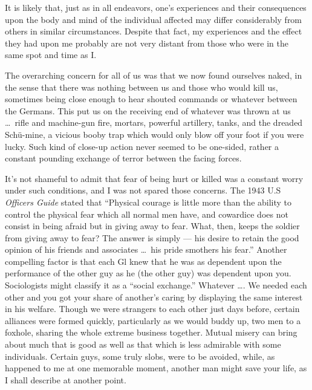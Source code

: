 \documentclass[../m3y]{subfiles}
\begin{document}
\label{beginning-of-action}
It is likely that, just as in all endeavors, one's experiences and their consequences upon the body and mind of the individual affected may differ considerably from others in similar circumstances. Despite that fact, my experiences and the effect they had upon me probably are not very distant from those who were in the same spot and time as I.

The overarching concern for all of us was that we now found ourselves naked, in the sense that there was nothing between us and those who would kill us, sometimes being close enough to hear shouted commands or whatever between the Germans. This put us on the receiving end of whatever was thrown at us \ldots\ rifle and machine-gun fire, mortars, powerful artillery, tanks, and the dreaded Sch{\"u}-mine, a vicious booby trap which would only blow off your foot if you were lucky. Such kind of close-up action never seemed to be one-sided, rather a constant pounding exchange of terror between the facing forces.

It's not shameful to admit that fear of being hurt or killed was a constant worry under such conditions, and I was not spared those concerns. The 1943 U.S \emph{Officers Guide} stated that ``Physical courage is little more than the ability to control the physical fear which all normal men have, and cowardice does not consist in being afraid but in giving away to fear. What, then, keeps the soldier from giving away to fear? The answer is simply --- his desire to retain the good opinion of his friends and associates \ldots\ his pride smothers his fear.'' Another compelling factor is that each Gl knew that he was as dependent upon the performance of the other guy as he (the other guy) was dependent upon you. Sociologists might classify it as a ``social exchange.'' Whatever \ldots\@. We needed each other and you got your share of another's caring by displaying the same interest in his welfare. Though we were strangers to each other just days before, certain alliances were formed quickly, particularly as we would buddy up, two men to a foxhole, sharing the whole extreme business together. Mutual misery can bring about much that is good as well as that which is less admirable with some individuals. Certain guys, some truly slobs, were to be avoided, while, as happened to me at one memorable moment, another man might save your life, as I shall describe at another point.
\end{document}
